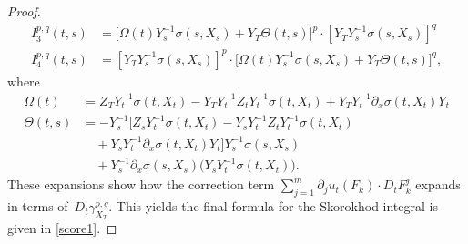 \documentclass[]{interact}
\newcommand{\1}{\mathbf{1}}
\theoremstyle{plain}%
\theoremstyle{definition}
\theoremstyle{remark}
\numberwithin{equation}{section}
\begin{document}
\begin{proof}
\begin{align*}
I^{p,q}_3(t,s) &= \bigg[ \Omega(t) Y_s^{-1}\sigma(s, X_s) + Y_T \Theta(t,s) \bigg]^p \cdot [Y_T Y_s^{-1} \sigma(s, X_s)]^q \\[0.5em]
I^{p,q}_4(t,s) &= [Y_T Y_s^{-1} \sigma(s, X_s)]^p \cdot \bigg[ \Omega(t) Y_s^{-1}\sigma(s, X_s) + Y_T \Theta(t,s) \bigg]^q,
\end{align*}
where
\begin{align*}
\Omega(t) &= Z_T Y_t^{-1} \sigma(t, X_t) - Y_T Y_t^{-1} Z_t Y_t^{-1} \sigma(t, X_t) + Y_T Y_t^{-1} \partial_x \sigma(t, X_t) Y_t \\[0.5em]
\Theta(t,s) &= -Y_s^{-1} \bigg[ Z_s Y_t^{-1} \sigma(t, X_t) - Y_s Y_t^{-1} Z_t Y_t^{-1} \sigma(t, X_t) \\
&\quad + Y_s Y_t^{-1} \partial_x \sigma(t, X_t) Y_t \bigg] Y_s^{-1} \sigma(s, X_s) \\
&\quad + Y_s^{-1} \partial_x \sigma(s, X_s) \bigg(Y_s Y_t^{-1} \sigma(t, X_t) \bigg).
\end{align*}
%
These expansions show how the correction term 
\(\sum_{j=1}^m \partial_j u_t(F_k) \cdot D_t F_k^j\) 
expands in terms of 
\(\,D_t \gamma_{X_T}^{p,q}\). 
%
This yields the final formula for the  Skorokhod integral is given in \eqref{score1}.



\end{proof}
\end{document}
